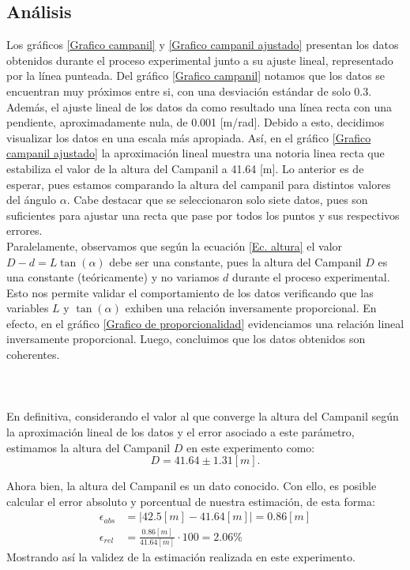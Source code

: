 \documentclass[10pt,a4paper]{article}
\begin{document}
	\begin{multicols}{2}
	\section{Análisis}
Los gráficos \ref{Grafico campanil} y \ref{Grafico campanil ajustado}  presentan los datos obtenidos durante el proceso experimental junto a su ajuste lineal, 		representado por la línea punteada. Del gráfico \ref{Grafico campanil} notamos que los datos se encuentran muy próximos entre si, 	con una desviación estándar de solo 0.3. Además, el ajuste lineal de los datos da como resultado una línea recta con una pendiente, aproximadamente nula, de 0.001 [m/rad]. Debido a esto, decidimos visualizar los datos en una escala más apropiada. Así, en el gráfico \ref{Grafico campanil ajustado} la aproximación lineal muestra una notoria linea recta que estabiliza el valor de la altura del Campanil a 41.64 [m]. Lo anterior es de esperar, pues estamos comparando la altura del campanil para distintos valores del ángulo $\alpha$. Cabe destacar que se seleccionaron solo siete datos, pues son suficientes para ajustar una recta que pase por todos los puntos y sus respectivos errores.\\

Paralelamente, observamos que según la ecuación \ref{Ec. altura} el valor $D - d = L \tan(\alpha)$ debe ser una constante, pues la altura del Campanil $D$ es una constante (teóricamente) y no variamos  $d$ durante el proceso experimental. Esto nos permite validar el comportamiento de los datos verificando que las variables $L$ y $\tan(\alpha)$ exhiben una relación inversamente proporcional. En efecto, en el gráfico \ref{Grafico de proporcionalidad} evidenciamos una relación lineal inversamente proporcional. Luego, concluimos que los datos obtenidos son coherentes.\\
\\
\\
\\
En definitiva, considerando el valor al que converge la altura del Campanil según la aproximación lineal de los datos y el error asociado a este parámetro, estimamos la altura del Campanil $D$ en este experimento como: $$D = 41.64 \pm 1.31 [m].$$
	

Ahora bien, la altura del Campanil es un dato conocido. Con ello, es posible calcular el error absoluto y porcentual de nuestra estimación, de esta forma:
\begin{align*}
\epsilon_{abs} &= |42.5[m] - 41.64[m]| = 0.86 [m]\\
\epsilon_{rel} &= \frac{0.86[m]}{41.64[m]}\cdot 100 = 2.06 \% 
\end{align*}
Mostrando así la validez de la estimación realizada en este experimento.
	

\end{multicols}
\end{document}
